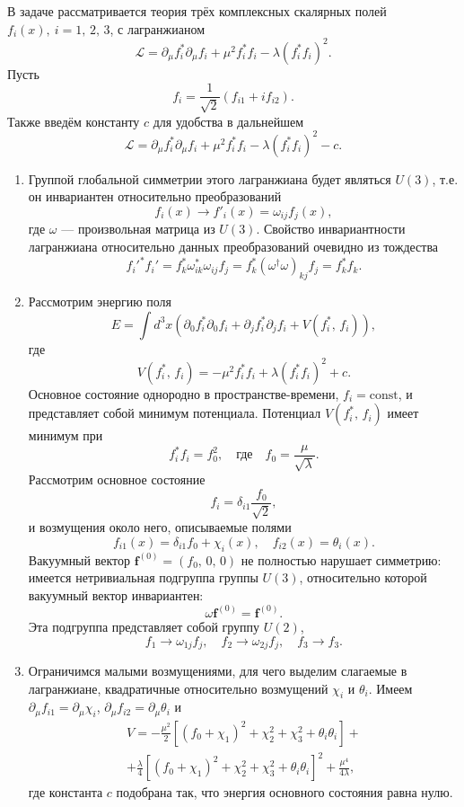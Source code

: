 \documentclass[a4paper]{article}
\begin{document}
\begin{sol}
В задаче рассматривается теория трёх комплексных скалярных
полей $f_i (x),\ i=1,\,2,\,3$, с лагранжианом
\[
	\mathcal{L}= \partial_\mu f_i^*\partial_\mu f_i+
	\mu^2 f_i^* f_i -\lambda (f_i ^* f_i)^2
.\] 
Пусть
\[
	f_i=\frac{1}{\sqrt{2} }(f_{i1}+i f_{i 2})
.\] 
Также введём константу $c$ для удобства в дальнейшем
\[
	\mathcal{L}= \partial_\mu f_i^*\partial_\mu f_i+
	\mu^2 f_i^* f_i -\lambda (f_i ^* f_i)^2-c
.\]
\renewcommand{\labelenumi}{\asbuk{enumi})}
\begin{enumerate}
\item Группой глобальной симметрии этого лагранжиана будет являться
	$U(3)$, т.\:е. он инвариантен относительно преобразований
\[
	f_i(x)\to f'_i(x)=\omega_{ij}f_j (x),
\] 
где $\omega$ --- произвольная матрица из $U(3)$. Свойство
инвариантности лагранжиана относительно данных преобразований
очевидно из тождества
\[
f_i'^*f_i'=f_k^*\omega_{ik}^* \omega_{ij} f_j=
f_k^*\left( \omega^\dagger \omega \right) _{kj} f_j=
f_k^* f_k
.\] 
\item Рассмотрим энергию поля
	\[
		E= \int d^3 x \left(\partial_0 f^*_i \partial_0
		f_i +\partial_j f^*_i \partial_j f_i+ V(f_i^*,\,
		f_i)\right)
	,\] 
где 
 \[
	 V(f_i^*,\,f_i)=-\mu^2 f_i^* f_i +\lambda(f_i^*f_i)^2+c
.\] 
Основное состояние однородно в пространстве-времени,
$f_i= \text{const}$, и представляет собой минимум потенциала.
Потенциал $V(f_i^*,\,f_i)$
имеет минимум при
\[
f_i^* f_i=f_0^2, \quad \text{где}\quad f_0= \frac{\mu}{\sqrt{\lambda} }
.\] 
Рассмотрим основное состояние
\[
f_i =\delta_{i 1} \frac{f_0}{\sqrt{2} }
 ,\]
и возмущения около него, описываемые полями
\[
	f_{i1}(x)=\delta_{i1} f_0 +\chi_i (x),\quad
	f_{i2}(x)=\theta_i (x)
.\] 
Вакуумный вектор $\mathbf{f}^{(0)}=(f_0,\,0,\,0)$ не полностью
нарушает симметрию: имеется нетривиальная подгруппа группы
$U(3)$, относительно которой вакуумный вектор инвариантен:
\[
	\omega \mathbf{f}^{(0)}=\mathbf{f}^{(0)}
.\] 
Эта подгруппа представляет собой группу $U(2)$,
\[
	f_1\to \omega_{1j}f_j,\quad
	f_2\to \omega_{2j}f_j,\quad
	f_3\to f_3
.\] 
\item Ограничимся малыми возмущениями, для  чего выделим  слагаемые
в лагранжиане, квадратичные относительно возмущений $\chi_i$ и
$\theta_i$. Имеем $\partial_\mu f_{i1}=\partial_\mu \chi_i$,
$\partial_\mu f_{i 2}=\partial_\mu \theta_i$ и
\begin{multline*}
V= -\frac{\mu^2}{2}\left[ 
(f_0 +\chi_1)^2+ \chi_2^2+\chi_3^2 +\theta_i\theta_i\right] +\\+
\frac{\lambda}{4}\left[ 
(f_0 +\chi_1)^2+ \chi_2^2+\chi_3^2 +\theta_i\theta_i\right] ^2+
\frac{\mu^4}{4\lambda}
,\end{multline*} 
где константа $c$ подобрана так, что энергия основного состояния
равна нулю.


\end{enumerate}
\end{sol}
\end{document}
